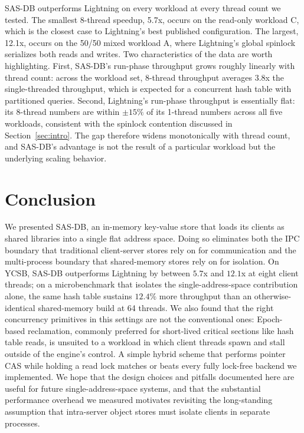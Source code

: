 SAS-DB outperforms Lightning on every workload at every thread count we tested.
The smallest 8-thread speedup, 5.7x, occurs on the read-only workload C, which
is the closest case to Lightning's best published configuration. The largest,
12.1x, occurs on the 50/50 mixed workload A, where Lightning's global spinlock
serializes both reads and writes. Two characteristics of the data are worth
highlighting. First, SAS-DB's run-phase throughput grows roughly linearly with
thread count: across the workload set, 8-thread throughput averages $3.8$x the
single-threaded throughput, which is expected for a concurrent hash table with
partitioned queries. Second, Lightning's run-phase throughput is essentially
flat: its 8-thread numbers are within $\pm 15\%$ of its 1-thread numbers across
all five workloads, consistent with the spinlock contention discussed in
Section~\ref{sec:intro}. The gap therefore widens monotonically with thread
count, and SAS-DB's advantage is not the result of a particular workload but the
underlying scaling behavior.

\section{Conclusion}

We presented SAS-DB, an in-memory key-value store that loads its clients as
shared libraries into a single flat address space. Doing so eliminates both the
IPC boundary that traditional client-server stores rely on for communication and
the multi-process boundary that shared-memory stores rely on for isolation. On
YCSB, SAS-DB outperforms Lightning by between $5.7$x and $12.1$x at eight client
threads; on a microbenchmark that isolates the single-address-space
contribution alone, the same hash table sustains $12.4\%$ more throughput than
an otherwise-identical shared-memory build at 64 threads. We also found that the
right concurrency primitives in this settings are not the conventional ones:
Epoch-based reclamation, commonly preferred for short-lived critical sections
like hash table reads, is unsuited to a workload in which client threads spawn
and stall outside of the engine's control. A simple hybrid scheme that performs
pointer CAS while holding a read lock matches or beats every fully lock-free
backend we implemented. We hope that the design choices and pitfalls documented
here are useful for future single-address-space systems, and that the
substantial performance overhead we measured motivates revisiting the
long-standing assumption that intra-server object stores must isolate clients in
separate processes.





